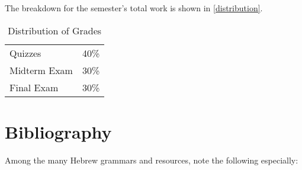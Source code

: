 \documentclass[titlepage]{article}
\newcommand\policy{../policy}
\begin{document}
The breakdown for the semester's total work is shown in
\autoref{distribution}.

\begin{table}[htbp]
  \centering
  {\lining
  \begin{tabular}{lr}
    \toprule
    Quizzes      & 40\% \\
    Midterm Exam & 30\% \\
    Final Exam   & 30\% \\
    \bottomrule
  \end{tabular}}
  \caption{Distribution of Grades}
  \label{distribution}
\end{table}





\section{Bibliography}
\label{bib}

Among the many Hebrew grammars and resources, note the following
especially:
\end{document}
